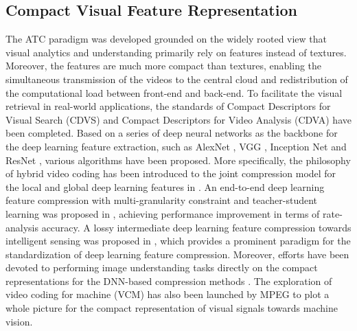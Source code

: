 \documentclass[transmag]{IEEEtran}
\begin{document}
\subsection{Compact Visual Feature Representation}
The ATC paradigm was developed grounded on the
widely rooted view that visual analytics and understanding primarily rely on features instead of textures. Moreover, the features are much more compact than textures, enabling the simultaneous transmission of the videos to the central cloud and redistribution of the computational load between front-end and back-end. 
To facilitate the visual retrieval in real-world applications, the standards of Compact Descriptors for Visual Search (CDVS) \cite{duan2015overview} and Compact Descriptors for Video Analysis (CDVA) \cite{duan2018compact} have been completed. 
Based on a series of deep neural networks as the backbone for the deep learning feature extraction, such as AlexNet \cite{krizhevsky2012imagenet}, VGG \cite{simonyan2014very}, Inception Net \cite{szegedy2015going} and ResNet \cite{he2016deep}, various algorithms have been proposed. More specifically, the philosophy of hybrid video coding has been introduced to the joint compression model for the local and global deep learning features in \cite{ding2020joint}. An end-to-end deep learning feature compression with multi-granularity constraint and teacher-student learning was proposed in \cite{wang2020end}, achieving performance improvement in terms of rate-analysis accuracy. A lossy intermediate deep learning feature compression towards intelligent sensing was proposed in \cite{chen2020toward}, which provides a prominent paradigm for the standardization of deep learning feature compression. Moreover, efforts have been devoted to performing image understanding tasks directly on the compact representations for the DNN-based compression methods \cite{torfason2018towards}.
The exploration of video coding for machine (VCM) \cite{duan2020video, vcmcfe} has also been launched by MPEG to plot a whole picture for the compact representation of visual signals towards machine vision.
\end{document}
